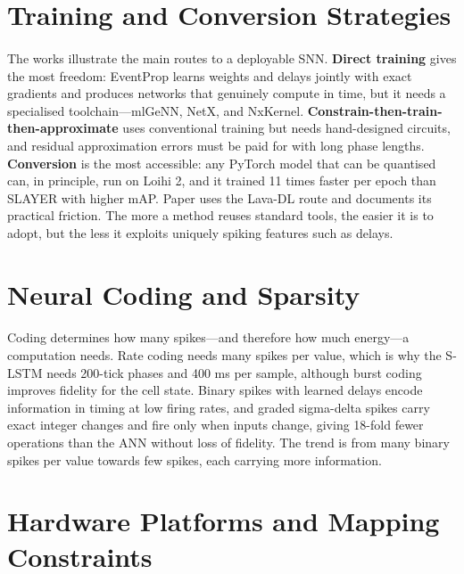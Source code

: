 \documentclass[12pt,a4paper,final]{extreport}
\begin{document}
\section{Training and Conversion Strategies}

\paragraph{} The works illustrate the main routes to a deployable SNN. \textbf{Direct training} \cite{p1} gives the most freedom: EventProp learns weights and delays jointly with exact gradients and produces networks that genuinely compute in time, but it needs a specialised toolchain---mlGeNN, NetX, and NxKernel. \textbf{Constrain-then-train-then-approximate} \cite{p3} uses conventional training but needs hand-designed circuits, and residual approximation errors must be paid for with long phase lengths. \textbf{Conversion} \cite{p4} is the most accessible: any PyTorch model that can be quantised can, in principle, run on Loihi 2, and it trained 11 times faster per epoch than SLAYER with higher mAP. Paper \cite{p2} uses the Lava-DL route and documents its practical friction. The more a method reuses standard tools, the easier it is to adopt, but the less it exploits uniquely spiking features such as delays.

\section{Neural Coding and Sparsity}

\paragraph{} Coding determines how many spikes---and therefore how much energy---a computation needs. Rate coding \cite{p3} needs many spikes per value, which is why the S-LSTM needs 200-tick phases and 400 ms per sample, although burst coding improves fidelity for the cell state. Binary spikes with learned delays \cite{p1} encode information in timing at low firing rates, and graded sigma-delta spikes \cite{p4} carry exact integer changes and fire only when inputs change, giving 18-fold fewer operations than the ANN without loss of fidelity. The trend is from many binary spikes per value towards few spikes, each carrying more information.

\section{Hardware Platforms and Mapping Constraints}
\end{document}
